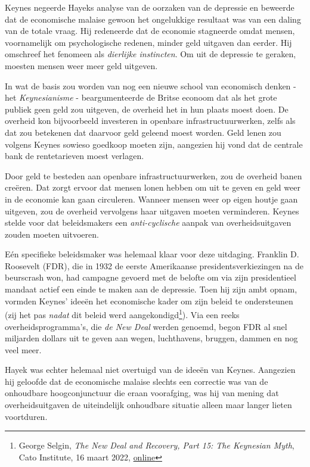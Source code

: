 \documentclass[
  a5paper,
  smalldemyvopaper,11pt,twoside,onecolumn,openright,extrafontsizes,
hidelinks]{memoir}
\begin{document}
Keynes negeerde Hayeks analyse van de oorzaken van de depressie en
beweerde dat de economische malaise gewoon het ongelukkige resultaat was
van een daling van de totale vraag. Hij redeneerde dat de economie
stagneerde omdat mensen, voornamelijk om psychologische redenen, minder
geld uitgaven dan eerder. Hij omschreef het fenomeen als \emph{dierlijke
instincten}. Om uit de depressie te geraken, moesten mensen weer meer
geld uitgeven.

In wat de basis zou worden van nog een nieuwe school van economisch
denken - het \emph{Keynesianisme} - beargumenteerde de Britse econoom
dat als het grote publiek geen geld zou uitgeven, de overheid het in hun
plaats moest doen. De overheid kon bijvoorbeeld investeren in openbare
infrastructuurwerken, zelfs als dat zou betekenen dat daarvoor geld
geleend moest worden. Geld lenen zou volgens Keynes sowieso goedkoop
moeten zijn, aangezien hij vond dat de centrale bank de rentetarieven
moest verlagen.

Door geld te besteden aan openbare infrastructuurwerken, zou de overheid
banen creëren. Dat zorgt ervoor dat mensen lonen hebben om uit te geven
en geld weer in de economie kan gaan circuleren. Wanneer mensen weer op
eigen houtje gaan uitgeven, zou de overheid vervolgens haar uitgaven
moeten verminderen. Keynes stelde voor dat beleidsmakers een
\emph{anti-cyclische} aanpak van overheidsuitgaven zouden moeten
uitvoeren.

Eén specifieke beleidsmaker was helemaal klaar voor deze uitdaging.
Franklin D. Roosevelt (FDR), die in 1932 de eerste Amerikaanse
presidentsverkiezingen na de beurscrash won, had campagne gevoerd met de
belofte om via zijn presidentieel mandaat actief een einde te maken aan
de depressie. Toen hij zijn ambt opnam, vormden Keynes' ideeën het
economische kader om zijn beleid te ondersteunen (zij het pas
\emph{nadat} dit beleid werd aangekondigd\footnote{\hspace{0pt}George
  Selgin, \emph{The New Deal and Recovery, Part 15: The Keynesian Myth},
  Cato Institute, 16 maart 2022,
  \href{https://www.cato.org/blog/new-deal-recovery-part-15-keynesian-myth.}{online}}).
Via een reeks overheidsprogramma's, die \emph{de New Deal} werden
genoemd, begon FDR al snel miljarden dollars uit te geven aan wegen,
luchthavens, bruggen, dammen en nog veel meer.

Hayek was echter helemaal niet overtuigd van de ideeën van Keynes.
Aangezien hij geloofde dat de economische malaise slechts een correctie
was van de onhoudbare hoogconjunctuur die eraan voorafging, was hij van
mening dat overheidsuitgaven de uiteindelijk onhoudbare situatie alleen
maar langer lieten voortduren.
\end{document}
